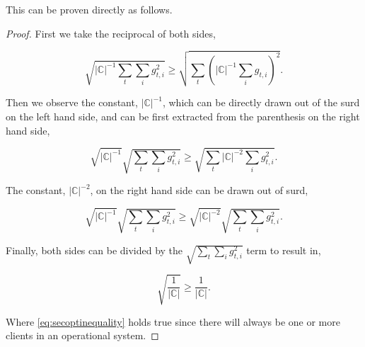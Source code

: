 \documentclass[conference,compsoc]{IEEEtran}
\begin{document}
This can be proven directly as follows.

\begin{proof}
    First we take the reciprocal of both sides,

    \begin{equation*}
        \sqrt{|\mathbb{C}|^{-1} \sum_t \sum_i g_{t, i}^2} \geq \sqrt{\sum_t (|\mathbb{C}|^{-1} \sum_i g_{t, i})^2}.
    \end{equation*}

    Then we observe the constant, $|\mathbb{C}|^{-1}$, which can be directly drawn out of the surd on the left hand side, and can be first extracted from the parenthesis on the right hand side,

    \begin{equation*}
        \sqrt{|\mathbb{C}|^{-1}} \sqrt{\sum_t \sum_i g_{t, i}^2} \geq \sqrt{\sum_t |\mathbb{C}|^{-2} \sum_i g_{t, i}^2}.
    \end{equation*}

    The constant, $|\mathbb{C}|^{-2}$, on the right hand side can be drawn out of surd,

    \begin{equation*}
        \sqrt{|\mathbb{C}|^{-1}} \sqrt{\sum_t \sum_i g_{t, i}^2} \geq \sqrt{|\mathbb{C}|^{-2}} \sqrt{\sum_t \sum_i g_{t, i}^2}.
    \end{equation*}

    Finally, both sides can be divided by the $\sqrt{\sum_t \sum_i g_{t, i}^2}$ term to result in,

    \begin{equation}
        \sqrt{\frac{1}{|\mathbb{C}|}} \geq \frac{1}{|\mathbb{C}|}.
        \label{eq:secoptinequality}
    \end{equation}

    Where \eqref{eq:secoptinequality} holds true since there will always be one or more clients in an operational system.
\end{proof}




\end{document}
